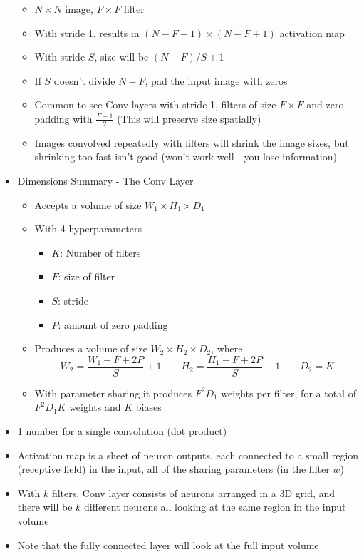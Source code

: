 \begin{itemize}
	\begin{itemize}
		\item $N\times N$ image, $F\times F$ filter
		\item With stride 1, results in $(N-F+1)\times (N-F+1)$ activation map
		\item With stride $S$, size will be $(N-F)/S + 1$
		\item If $S$ doesn't divide $N-F$, pad the input image with zeros
		\item Common to see Conv layers with stride 1, filters of size $F\times F$ and zero-padding with $\frac{F-1}{2}$ (This will preserve size spatially)
		\item Images convolved repeatedly with filters will shrink the image sizes, but shrinking too fast isn't good (won't work well - you lose information)		
	\end{itemize}
	\item Dimensions Summary - The Conv Layer
	\begin{itemize}
		\item Accepts a volume of size $W_1 \times H_1\times D_1$
		\item With 4 hyperparameters
		\begin{itemize}
			\item $K$: Number of filters
			\item $F$: size of filter
			\item $S$: stride
			\item $P$: amount of zero padding
		\end{itemize}
		\item Produces a volume of size $W_2\times H_2\times D_2$, where
		$$W_2 = \frac{W_1-F+2P}{S} + 1 \qquad H_2 = \frac{H_1 - F+2P}{S}+1\qquad D_2 = K$$
		\item With parameter sharing it produces $F^2D_1$ weights per filter, for a total of $F^2D_1K$ weights and $K$ biases
	\end{itemize}
	\item 1 number for a single convolution (dot product)
	\item Activation map is a sheet of neuron outputs, each connected to a small region (receptive field) in the input, all of the sharing parameters (in the filter $w$)
	\item With $k$ filters, Conv layer consists of neurons arranged in a 3D grid, and there will be $k$ different neurons all looking at the same region in the input volume
	\item Note that the fully connected layer will look at the full input volume
\end{itemize}

